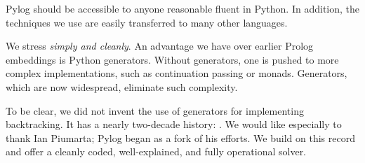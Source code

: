Pylog should be accessible to anyone reasonable fluent in Python. In addition, the techniques we use are easily transferred to many other languages. 


We stress \textit{simply and cleanly}. An advantage we have over earlier Prolog embeddings is Python generators. Without generators, one is pushed to more complex implementations, such as continuation passing\cite{amin2019lightweight} or monads\cite{seres1999embedding}. Generators, which are now widespread\cite{wikipedia-generators}, eliminate such complexity.  %

To be clear, we did not invent the use of generators for implementing backtracking. It has a nearly two-decade history: \cite{berger2004, Bolz2007, Delford2009, Frederiksen2011, Meyers2015, Thompson2017, Santini2018, Cesar2019, Miljkovic2019}. We would like especially to thank Ian Piumarta\cite{Piumarta2017}; Pylog began as a fork of his efforts. We build on this record and offer a cleanly coded, well-explained, and fully operational solver.



